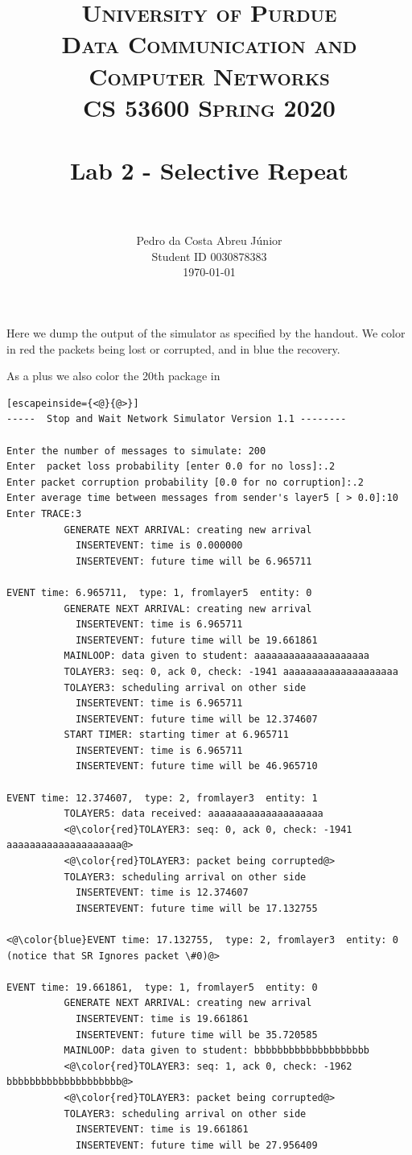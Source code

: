 \documentclass[paper=a4, fontsize=11pt]{scrartcl}
\title{
		\usefont{OT1}{bch}{b}{n}
		\normalfont \normalsize \textsc{University of Purdue\\
      Data Communication and Computer Networks\\
      CS 53600 Spring 2020} \\ [25pt]
		\horrule{0.5pt} \\[0.4cm]
		\huge Lab 2 - Selective Repeat\\
		\horrule{2pt} \\[0.5cm]
}
\author{
		\normalfont\normalsize Pedro da Costa Abreu Júnior\\ [-5pt]
    \normalsize Student ID 0030878383\\[-5pt]
    \normalsize \today
}
\date{}
\numberwithin{equation}{section}		%
\numberwithin{figure}{section}			%
\numberwithin{table}{section}				%
\begin{document}
\maketitle

Here we dump the output of the simulator as specified by the handout. We color in {\color{red}red} the packets being lost or corrupted, and in {\color{blue}blue} the recovery.

As a plus we also color the 20th package in {\color{green}{green}}


\begin{lstlisting}[escapeinside={<@}{@>}]
-----  Stop and Wait Network Simulator Version 1.1 --------

Enter the number of messages to simulate: 200
Enter  packet loss probability [enter 0.0 for no loss]:.2
Enter packet corruption probability [0.0 for no corruption]:.2
Enter average time between messages from sender's layer5 [ > 0.0]:10
Enter TRACE:3
          GENERATE NEXT ARRIVAL: creating new arrival
            INSERTEVENT: time is 0.000000
            INSERTEVENT: future time will be 6.965711

EVENT time: 6.965711,  type: 1, fromlayer5  entity: 0
          GENERATE NEXT ARRIVAL: creating new arrival
            INSERTEVENT: time is 6.965711
            INSERTEVENT: future time will be 19.661861
          MAINLOOP: data given to student: aaaaaaaaaaaaaaaaaaaa
          TOLAYER3: seq: 0, ack 0, check: -1941 aaaaaaaaaaaaaaaaaaaa
          TOLAYER3: scheduling arrival on other side
            INSERTEVENT: time is 6.965711
            INSERTEVENT: future time will be 12.374607
          START TIMER: starting timer at 6.965711
            INSERTEVENT: time is 6.965711
            INSERTEVENT: future time will be 46.965710

EVENT time: 12.374607,  type: 2, fromlayer3  entity: 1
          TOLAYER5: data received: aaaaaaaaaaaaaaaaaaaa
          <@\color{red}TOLAYER3: seq: 0, ack 0, check: -1941 aaaaaaaaaaaaaaaaaaaa@>
          <@\color{red}TOLAYER3: packet being corrupted@>
          TOLAYER3: scheduling arrival on other side
            INSERTEVENT: time is 12.374607
            INSERTEVENT: future time will be 17.132755

<@\color{blue}EVENT time: 17.132755,  type: 2, fromlayer3  entity: 0 (notice that SR Ignores packet \#0)@>

EVENT time: 19.661861,  type: 1, fromlayer5  entity: 0
          GENERATE NEXT ARRIVAL: creating new arrival
            INSERTEVENT: time is 19.661861
            INSERTEVENT: future time will be 35.720585
          MAINLOOP: data given to student: bbbbbbbbbbbbbbbbbbbb
          <@\color{red}TOLAYER3: seq: 1, ack 0, check: -1962 bbbbbbbbbbbbbbbbbbbb@>
          <@\color{red}TOLAYER3: packet being corrupted@>
          TOLAYER3: scheduling arrival on other side
            INSERTEVENT: time is 19.661861
            INSERTEVENT: future time will be 27.956409


\end{lstlisting}
\end{document}
